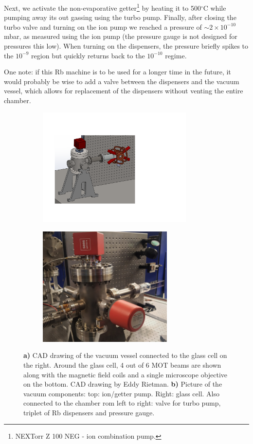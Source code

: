 Next, we activate the non-evaporative getter\footnote{NEXTorr Z 100 NEG - ion combination pump.} by heating it to 500${}^{\circ}$C while pumping away its out gassing using the turbo pump. Finally, after closing the turbo valve and turning on the ion pump we reached a pressure of $\sim 2\times 10^{-10}$ mbar, as measured using the ion pump (the pressure gauge is not designed for pressures this low).
When turning on the dispensers, the pressure briefly spikes to the $10^{-9}$ region but quickly returns back to the $10^{-10}$ regime.

One note: if this Rb machine is to be used for a longer time in the future, it would probably be wise to add a valve between the dispensers and the vacuum vessel, which allows for replacement of the dispensers without venting the entire chamber. 





\begin{figure}
	\begin{subfigure}{.54\linewidth}
		\centering
		\includegraphics[height=6cm]{figures/Vacuum.pdf}
		\caption{}
		\label{fig:VacuumSetup}
	\end{subfigure}
	\hfill
	\begin{subfigure}{.44\linewidth}
		\centering
		\includegraphics[height=6cm]{figures/Chamber.jpg}
		\caption{}
		\label{fig:Chamber}
	\end{subfigure}
	\caption{\textbf{a)} CAD drawing of the vacuum vessel connected to the glass cell on the right. 
	Around the glass cell, 4 out of 6 MOT beams are shown along with the magnetic field coils and a single microscope objective on the bottom. 
	CAD drawing by Eddy Rietman.
	\textbf{b)} Picture of the vacuum components: top: ion/getter pump. Right: glass cell. Also connected to the chamber rom left to right: valve for turbo pump, triplet of Rb dispensers and pressure gauge.}
\end{figure}

